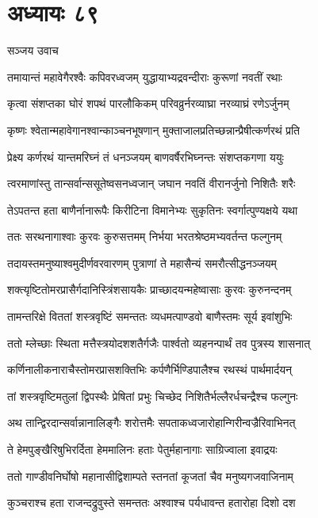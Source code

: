\chapter{अध्यायः ८९}
\twolineshloka
{सञ्जय उवाच}
{}


\twolineshloka
{तमायान्तं महावेगैरश्वैः कपिवरध्वजम्}
{युद्धायाभ्यद्रवन्दीराः कुरूणां नवतीं रथाः}


\twolineshloka
{कृत्वा संशप्तका घोरं शपथं पारलौकिकम्}
{परिवव्रुर्नरव्याघ्रा नरव्याघ्रं रणेऽर्जुनम्}


\twolineshloka
{कृष्णः श्वेतान्महावेगानश्वान्काञ्चनभूषणान्}
{मुक्ताजालप्रतिच्छन्नान्प्रैषीत्कर्णरथं प्रति}


\twolineshloka
{प्रेक्ष्य कर्णरथं यान्तमरिघ्नं तं धनञ्जयम्}
{बाणवर्षैरभिघ्नन्तः संशप्तकगणा ययुः}


\twolineshloka
{त्वरमाणांस्तु तान्सर्वान्ससूतेष्वसनध्वजान्}
{जघान नवतिं वीरानर्जुनो निशितैः शरैः}


\twolineshloka
{तेऽपतन्त हता बाणैर्नानारूपैः किरीटिना}
{विमानेभ्यः सुकृतिनः स्वर्गात्पुण्यक्षये यथा}


\twolineshloka
{ततः सरथनागाश्वाः कुरवः कुरुसत्तमम्}
{निर्भया भरतश्रेष्ठमभ्यवर्तन्त फल्गुनम्}


\twolineshloka
{तदायस्तमनुष्याश्वमुदीर्णवरवारणम्}
{पुत्राणां ते महासैन्यं समरौत्सीद्धनञ्जयम्}


\twolineshloka
{शक्त्यृष्टितोमरप्रासैर्गदानिस्त्रिंशसायकैः}
{प्राच्छादयन्महेष्वासाः कुरवः कुरुनन्दनम्}


\twolineshloka
{तामन्तरिक्षे विततां शस्त्रवृष्टिं समन्ततः}
{व्यधमत्पाण्डवो बाणैस्तमः सूर्य इवांशुभिः}


\twolineshloka
{ततो म्लेच्छाः स्थिता मत्तैस्त्रयोदशशतैर्गजैः}
{पार्श्वतो व्यहनन्पार्थं तव पुत्रस्य शासनात्}


\twolineshloka
{कर्णिनालीकनाराचैस्तोमरप्रासशक्तिभिः}
{कर्पणैर्भिण्डिपालैश्च रथस्थं पार्थमार्दयन्}


\twolineshloka
{तां शस्त्रवृष्टिमतुलां द्विपस्थैः प्रेषितां प्रभुः}
{चिच्छेद निशितैर्भल्लैरर्धचन्द्रैश्च फल्गुनः}


\twolineshloka
{अथ तान्द्विरदान्सर्वान्नानालिङ्गैः शरोत्तमैः}
{सपताकध्वजारोहान्गिरीन्वज्रैरिवाभिनत्}


\twolineshloka
{ते हेमपुङ्खैरिषुभिरर्दिता हेममालिनः}
{हताः पेतुर्महानागाः साग्रिज्वाला इवाद्रयः}


\twolineshloka
{ततो गाण्डीवनिर्घोषो महानासीद्विशाम्पते}
{स्तनतां कूजतां चैव मनुष्यगजवाजिनाम्}


\twolineshloka
{कुञ्चराश्च हता राजन्दद्रुवुस्ते समन्ततः}
{अश्वाश्च पर्यधावन्त हतारोहा दिशो दश}



